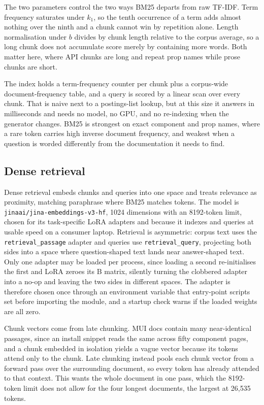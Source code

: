 \documentclass[10pt,a4paper]{article}
\begin{document}
The two parameters control the two ways BM25 departs from raw TF-IDF. Term frequency saturates under $k_1$, so the tenth occurrence of a term adds almost nothing over the ninth and a chunk cannot win by repetition alone. Length normalisation under $b$ divides by chunk length relative to the corpus average, so a long chunk does not accumulate score merely by containing more words. Both matter here, where API chunks are long and repeat prop names while prose chunks are short.

The index holds a term-frequency counter per chunk plus a corpus-wide document-frequency table, and a query is scored by a linear scan over every chunk. That is naive next to a postings-list lookup, but at this size it answers in milliseconds and needs no model, no GPU, and no re-indexing when the generator changes. BM25 is strongest on exact component and prop names, where a rare token carries high inverse document frequency, and weakest when a question is worded differently from the documentation it needs to find.

\subsection{Dense retrieval}

Dense retrieval embeds chunks and queries into one space and treats relevance as proximity, matching paraphrase where BM25 matches tokens. The model is \texttt{jinaai/jina-embeddings-v3-hf}, 1024 dimensions with an 8192-token limit, chosen for its task-specific LoRA adapters and because it indexes and queries at usable speed on a consumer laptop. Retrieval is asymmetric: corpus text uses the \texttt{retrieval\_passage} adapter and queries use \texttt{retrieval\_query}, projecting both sides into a space where question-shaped text lands near answer-shaped text. Only one adapter may be loaded per process, since loading a second re-initialises the first and LoRA zeroes its B matrix, silently turning the clobbered adapter into a no-op and leaving the two sides in different spaces. The adapter is therefore chosen once through an environment variable that entry-point scripts set before importing the module, and a startup check warns if the loaded weights are all zero.

Chunk vectors come from late chunking. MUI docs contain many near-identical passages, since an install snippet reads the same across fifty component pages, and a chunk embedded in isolation yields a vague vector because its tokens attend only to the chunk. Late chunking instead pools each chunk vector from a forward pass over the surrounding document, so every token has already attended to that context. This wants the whole document in one pass, which the 8192-token limit does not allow for the four longest documents, the largest at 26{,}535 tokens.
\end{document}
